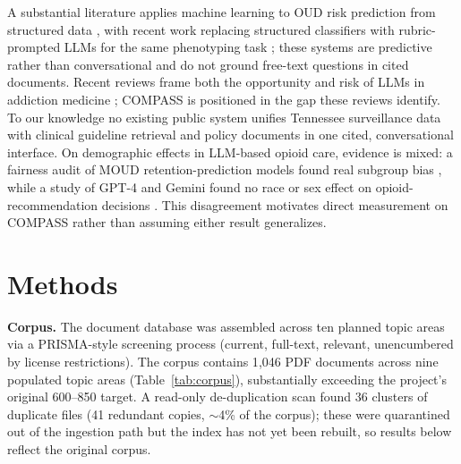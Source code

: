 \documentclass[letterpaper]{article}
\begin{document}
A substantial literature applies machine learning to OUD risk prediction from structured data \citep{lociganic2019,lociganic2022,dong2021,dong2023,carrell2020,afshar2022}, with recent work replacing structured classifiers with rubric-prompted LLMs for the same phenotyping task \citep{lyu2026}; these systems are predictive rather than conversational and do not ground free-text questions in cited documents. Recent reviews frame both the opportunity and risk of LLMs in addiction medicine \citep{srivastava2024,zitu2026}; COMPASS is positioned in the gap these reviews identify. To our knowledge no existing public system unifies Tennessee surveillance data with clinical guideline retrieval and policy documents in one cited, conversational interface. On demographic effects in LLM-based opioid care, evidence is mixed: a fairness audit of MOUD retention-prediction models found real subgroup bias \citep{wang2026fairness}, while a study of GPT-4 and Gemini found no race or sex effect on opioid-recommendation decisions \citep{young2024}. This disagreement motivates direct measurement on COMPASS rather than assuming either result generalizes.

\section{Methods}

\textbf{Corpus.} The document database was assembled across ten planned topic areas via a PRISMA-style screening process (current, full-text, relevant, unencumbered by license restrictions). The corpus contains 1{,}046 PDF documents across nine populated topic areas (Table~\ref{tab:corpus}), substantially exceeding the project's original 600--850 target. A read-only de-duplication scan found 36 clusters of duplicate files (41 redundant copies, $\sim$4\% of the corpus); these were quarantined out of the ingestion path but the index has not yet been rebuilt, so results below reflect the original corpus.
\end{document}

